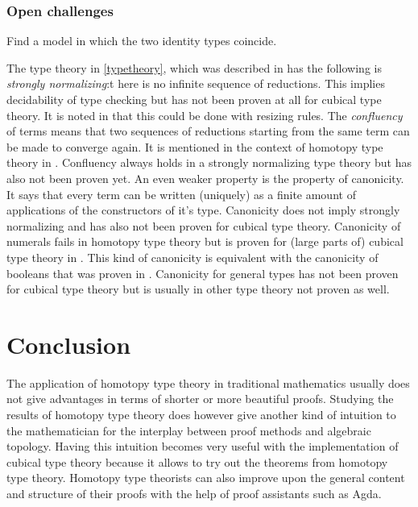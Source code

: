 \documentclass[12pt,a4paper,twoside,xetex,draft]{book}
\newcommand{\keyword}[1]{\emph{#1}\index{#1}}
\begin{document}

\subsection{Open challenges}\label{normalizing}

Find a model in which the two identity types coincide.

The type theory in \cref{typetheory}, which was described in \cite{Loef1975} has the following is \keyword{strongly normalizing}:t here is no infinite sequence of reductions. This implies decidability of type checking but has not been proven at all for cubical type theory. It is noted in \cite{Cohen2016} that this could be done with resizing rules. The \keyword{confluency} of terms means that two sequences of reductions starting from the same term can be made to converge again. It is mentioned in the context of homotopy type theory in \cite{HuCo11}. Confluency always holds in a strongly normalizing type theory but has also not been proven yet. An even weaker property is the property of canonicity. It says that every term can be written (uniquely) as a finite amount of applications of the constructors of it's type. Canonicity does not imply strongly normalizing and has also not been proven for cubical type theory. Canonicity  of numerals fails in homotopy type theory but is proven for (large parts of) cubical type theory in \cite{Huber2017,Coquand2019,Hub19}. This kind of canonicity is equivalent with the canonicity of booleans that was proven in \cite{Angiuli2018}. Canonicity for general types has not been proven for cubical type theory but is usually in other type theory not proven as well.

% 






\chapter*{Conclusion}

The application of homotopy type theory in traditional mathematics usually does not give advantages in terms of shorter or more beautiful proofs. Studying the results of homotopy type theory does however give another kind of intuition to the mathematician for the interplay between proof methods and algebraic topology. Having this intuition becomes very useful with the implementation of cubical type theory because it allows to try out the theorems from homotopy type theory. Homotopy type theorists can also improve upon the general content and structure of their proofs with the help of proof assistants such as Agda. 
\end{document}
